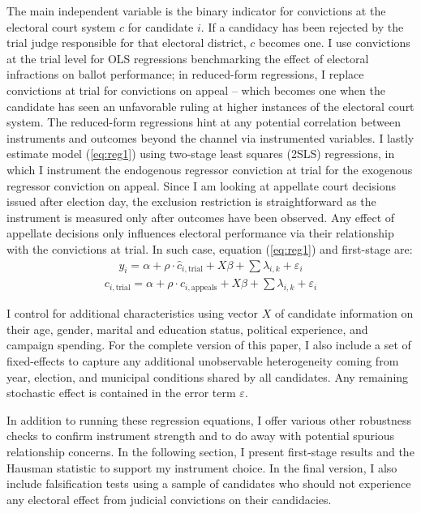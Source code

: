 \documentclass[11pt]{article}
\newcommand{\refp}[1]{(\ref{#1})}
\begin{document}
The main independent variable is the binary indicator for convictions at the electoral court system $c$ for candidate $i$. If a candidacy has been rejected by the trial judge responsible for that electoral district, $c$ becomes one. I use convictions at the trial level for OLS regressions benchmarking the effect of electoral infractions on ballot performance; in reduced-form regressions, I replace convictions at trial for convictions on appeal -- which becomes one when the candidate has seen an unfavorable ruling at higher instances of the electoral court system. The reduced-form regressions hint at any potential correlation between instruments and outcomes beyond the channel via instrumented variables. I lastly estimate model \refp{eq:reg1} using two-stage least squares (2SLS) regressions, in which I instrument the endogenous regressor conviction at trial for the exogenous regressor conviction on appeal. Since I am looking at appellate court decisions issued after election day, the exclusion restriction is straightforward as the instrument is measured only after outcomes have been observed. Any effect of appellate decisions only influences electoral performance via their relationship with the convictions at trial. In such case, equation \refp{eq:reg1} and first-stage are:
\begin{equation} \label{eq:reg2}
  \begin{split}
    y_{i} = \alpha + \rho \cdot \hat{c}_{i, \text{trial}} + X\beta + \sum \lambda_{i, k} + \varepsilon_{i}
  \end{split}
\end{equation}
\begin{equation} \label{eq:regfirststage}
  \begin{split}
    c_{i, \text{trial}} = \alpha + \rho \cdot c_{i, \text{appeals}} + X\beta + \sum \lambda_{i, k} + \varepsilon_{i}
  \end{split}
\end{equation}

I control for additional characteristics using vector $X$ of candidate information on their age, gender, marital and education status, political experience, and campaign spending. For the complete version of this paper, I also include a set of fixed-effects to capture any additional unobservable heterogeneity coming from year, election, and municipal conditions shared by all candidates. Any remaining stochastic effect is contained in the error term $\varepsilon$.

In addition to running these regression equations, I offer various other robustness checks to confirm instrument strength and to do away with potential spurious relationship concerns. In the following section, I present first-stage results and the Hausman statistic to support my instrument choice. In the final version, I also include falsification tests using a sample of candidates who should not experience any electoral effect from judicial convictions on their candidacies.
\end{document}
